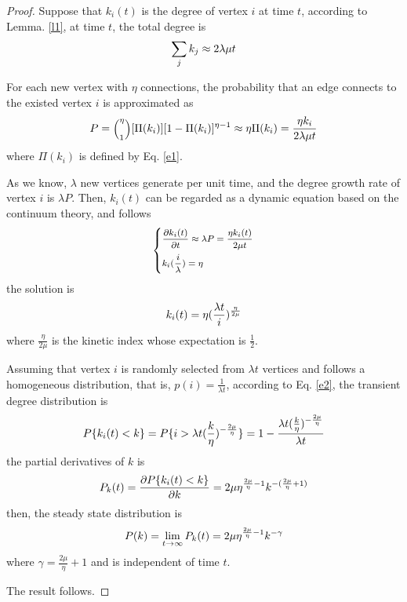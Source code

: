 \documentclass[final]{IEEEtran}
\begin{document}
\begin{proof}
Suppose that $k_{i}(t)$ is the degree of vertex $i$ at time $t$,
according to Lemma. \ref{l1}, at time $t$, the total degree is
\begin{equation}\footnotesize
\sum\limits_{j}k_{j}\approx2\lambda\mu t
\end{equation}

For each new vertex with $\eta$ connections, the probability that
an edge connects to the existed vertex $i$ is approximated as
\begin{equation}\label{e11}\footnotesize
P=\Big(^{\eta}_{1}\Big )
[\Pi(k_{i})][1-\Pi(k_{i})]^{\eta-1}\approx\eta\Pi(k_{i})=\frac{\eta
k_{i}}{2\lambda\mu t}
\end{equation}
where $\Pi(k_{i})$ is defined by Eq. \ref{e1}.

As we know, $\lambda$ new vertices generate per unit time, and the
degree growth rate of vertex $i$ is $\lambda P$. Then, $k_{i}(t)$
can be regarded as a dynamic equation based on the continuum
theory, and follows
\begin{equation}\footnotesize
  \left\{
   \begin{aligned}
   &\frac{\partial k_{i}(t)}{\partial t} \approx \lambda P =\frac{\eta
k_{i}(t)}{2\mu t}\\
&k_{i}(\frac{i}{\lambda})=\eta\\
   \end{aligned}
   \right.
  \end{equation}
the solution is
\begin{equation}\label{e2}\footnotesize
k_{i}(t)=\eta(\frac{\lambda t}{i})^{\frac{\eta}{2\mu}}
\end{equation}
where $\frac{\eta}{2\mu}$ is the kinetic index whose expectation
is $\frac{1}{2}$.

Assuming that vertex $i$ is randomly selected from $\lambda t$
vertices and follows a homogeneous distribution, that is,
$p(i)$$=$$\frac{1}{\lambda t}$, according to Eq. \ref{e2}, the
transient degree distribution is
\begin{equation}\footnotesize
P\{k_{i}(t)<k\}=P\{i>\lambda
t(\frac{k}{\eta})^{-\frac{2\mu}{\eta}}\}=1-\frac{\lambda
t(\frac{k}{\eta})^{-\frac{2\mu}{\eta}}}{\lambda t}
\end{equation}
the partial derivatives of $k$ is
\begin{equation}\footnotesize
P_{k}(t)=\frac{\partial P\{k_{i}(t)<k\}}{\partial
k}=2\mu\eta^{\frac{2\mu}{\eta}-1}k^{-(\frac{2\mu}{\eta}+1)}
\end{equation}
then, the steady state distribution is
\begin{equation}\label{eq16}\footnotesize
P(k)=\lim\limits_{t\rightarrow\infty}P_{k}(t)=2\mu\eta^{\frac{2\mu}{\eta}-1}k^{-\gamma}
\end{equation}
where $\gamma$$=$$\frac{2\mu}{\eta}+1$ and is independent of time
$t$.

The result follows.
\end{proof}
\end{document}
